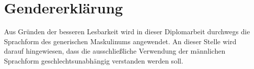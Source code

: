 \section*{Gendererklärung}

Aus Gründen der besseren Lesbarkeit wird in dieser Diplomarbeit durchwegs die Sprachform des generischen Maskulinums angewendet. An dieser Stelle wird darauf hingewiesen, dass die ausschließliche Verwendung der männlichen Sprachform geschlechtsunabhängig verstanden werden soll.

\newpage